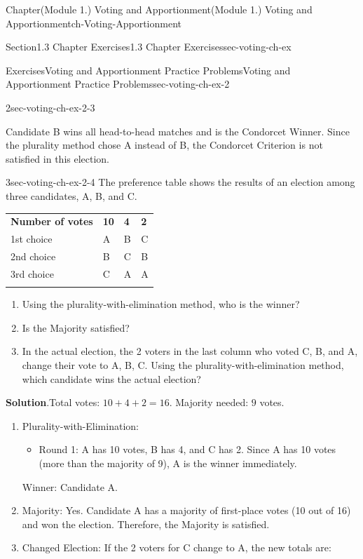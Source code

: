 \documentclass[oneside,10pt,]{book}
\newcommand{\blocktitlefont}{\relax}
\newcommand{\tabularfont}{\relax}
\newcommand{\ptxlistdisc}{\raisebox{0.3ex}{\textbullet}}
\newcommand{\hrulethin}  {\noalign{\hrule height 0.04em}}
\begin{document}
\begin{chapterptx}{Chapter}{(Module 1.) Voting and Apportionment}{}{(Module 1.) Voting and Apportionment}{}{}{ch-Voting-Apportionment}
\begin{sectionptx}{Section}{1.3 Chapter Exercises}{}{1.3 Chapter Exercises}{}{}{sec-voting-ch-ex}
\begin{exercises-subsection-numberless}{Exercises}{Voting and Apportionment Practice Problems}{}{Voting and Apportionment Practice Problems}{}{}{sec-voting-ch-ex-2}
\begin{divisionexercise}{2}{}{}{sec-voting-ch-ex-2-3}
\begin{enumerate}[label={(\alph*)}]
\begin{itemize}[label=\ptxlistdisc]
\end{itemize}
Candidate B wins all head-to-head matches and is the Condorcet Winner. Since the plurality method chose A instead of B, the Condorcet Criterion is not satisfied in this election.%
\end{enumerate}
%
\end{divisionexercise}%
\begin{divisionexercise}{3}{}{}{sec-voting-ch-ex-2-4}%
The preference table shows the results of an election among three candidates, A, B, and C.%
\begin{center}%
{\tabularfont%
\begin{tabular}{llll}\hrulethin
{\bfseries{}Number of votes}&{\bfseries{}10}&{\bfseries{}4}&{\bfseries{}2}\tabularnewline\hrulethin
1st choice&A&B&C\tabularnewline\hrulethin
2nd choice&B&C&B\tabularnewline\hrulethin
3rd choice&C&A&A\tabularnewline\hrulethin
\end{tabular}
}%
\end{center}%
%
\begin{enumerate}[label={(\alph*)}]
\item{}Using the plurality-with-elimination method, who is the winner?%
\item{}Is the Majority satisfied?%
\item{}In the actual election, the 2 voters in the last column who voted C, B, and A, change their vote to A, B, C. Using the plurality-with-elimination method, which candidate wins the actual election?%
\end{enumerate}
%
\par\smallskip%
\noindent\textbf{\blocktitlefont Solution}.\hypertarget{sec-voting-ch-ex-2-4-2}{}\quad{}Total votes: \(10 + 4 + 2 = 16\). Majority needed: \(9\) votes.%
\par
%
\begin{enumerate}[label={(\alph*)}]
\item{}Plurality-with-Elimination:%
\begin{itemize}[label=\ptxlistdisc]
\item{}Round 1: A has 10 votes, B has 4, and C has 2. Since A has 10 votes (more than the majority of 9), A is the winner immediately.%
\end{itemize}
Winner: Candidate A.%
\item{}Majority: Yes. Candidate A has a majority of first-place votes (10 out of 16) and won the election. Therefore, the Majority is satisfied.%
\item{}Changed Election: If the 2 voters for C change to A, the new totals are:%

\end{enumerate}
\end{divisionexercise}
\end{exercises-subsection-numberless}
\end{sectionptx}
\end{chapterptx}
\end{document}
